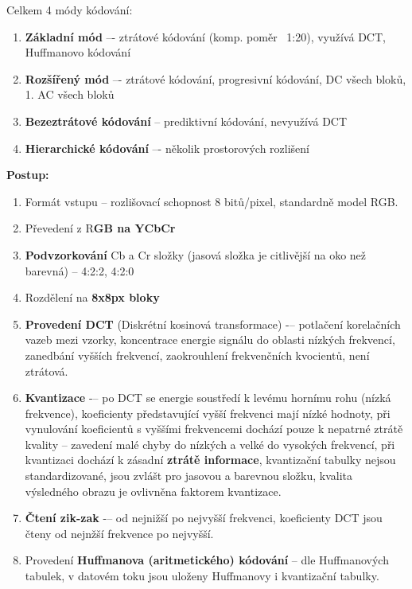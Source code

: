 Celkem 4 módy kódování:  \vspace{-4mm}
\begin{enumerate}
    \item \textbf{Základní mód} –- ztrátové kódování (komp. poměr ~1:20), využívá DCT, Huffmanovo kódování
    \item \textbf{Rozšířený mód} –- ztrátové kódování, progresivní kódování, DC všech bloků, 1. AC všech bloků
    \item \textbf{Bezeztrátové kódování} -- prediktivní kódování, nevyužívá DCT
    \item \textbf{Hierarchické kódování} –- několik prostorových rozlišení
\end{enumerate}

\textbf{Postup:} \vspace{-4mm}
\begin{enumerate}
    \item Formát vstupu -- rozlišovací schopnost 8 bitů/pixel, standardně model RGB.
    \item Převedení z R\textbf{GB na YCbCr}
    \item \textbf{Podvzorkování} Cb a Cr složky (jasová složka je citlivější na oko než barevná) -- 4:2:2, 4:2:0
    \item Rozdělení na \textbf{8x8px bloky}
    \item \textbf{Provedení DCT} (Diskrétní kosinová transformace) -– potlačení korelačních vazeb mezi vzorky, koncentrace energie signálu do oblasti nízkých frekvencí, zanedbání vyšších frekvencí, zaokrouhlení frekvenčních kvocientů, není ztrátová.
    \item \textbf{Kvantizace} -– po DCT se energie soustředí k levému hornímu rohu (nízká frekvence), koeficienty představující vyšší frekvenci mají nízké hodnoty, při vynulování koeficientů s vyššími frekvencemi dochází pouze k nepatrné ztrátě kvality -- zavedení malé chyby do nízkých a velké do vysokých frekvencí, při kvantizaci dochází k zásadní \textbf{ztrátě informace}, kvantizační tabulky nejsou standardizované, jsou zvlášt pro jasovou a barevnou složku, kvalita výsledného obrazu je ovlivněna faktorem kvantizace.
    \item \textbf{Čtení zik-zak} -– od nejnižší po nejvyšší frekvenci, koeficienty DCT jsou čteny od nejnžší frekvence po nejvyšší.
    \item Provedení \textbf{Huffmanova (aritmetického) kódování} -- dle Huffmanových tabulek, v datovém toku jsou uloženy Huffmanovy i kvantizační tabulky.
\end{enumerate}

